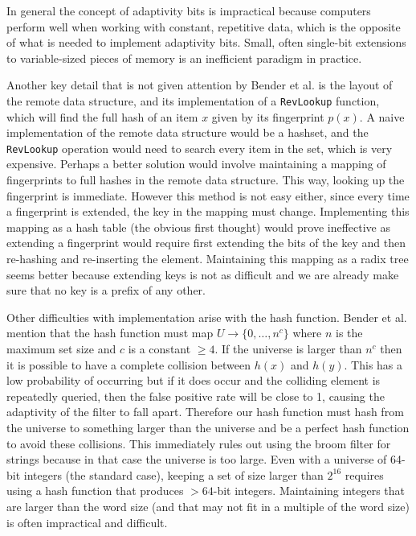 \documentclass[../paper.tex]{subfiles}
\begin{document}
In general the concept of adaptivity bits is impractical because computers perform
well when working with constant, repetitive data, which is the opposite
of what is needed to implement adaptivity bits. Small, often single-bit
extensions to variable-sized pieces of memory is an inefficient paradigm
in practice.

Another key detail that is not given attention by Bender et al. is the layout
of the remote data structure, and its implementation of a \texttt{RevLookup}
function, which will find the full hash of an item $x$ given by its fingerprint
$p(x)$. A naive implementation of the remote data structure would be a hashset,
and the \texttt{RevLookup} operation would need to search every item in the
set, which is very expensive. Perhaps a better solution would involve maintaining
a mapping of fingerprints to full hashes in the remote data structure. This
way, looking up the fingerprint is immediate. However this method is not easy
either, since every time a fingerprint is extended, the key in the mapping must change.
Implementing this mapping as a hash table (the obvious first thought) would prove
ineffective as extending a fingerprint would require first extending the bits of
the key and then re-hashing and re-inserting the element. Maintaining this mapping
as a radix tree seems better because extending keys is not as difficult and
we are already make sure that no key is a prefix of any other.

Other difficulties with implementation arise with the hash function. Bender et al.
mention that the hash function must map $U \rightarrow \{0,\ldots,n^c\}$ where
$n$ is the maximum set size and $c$ is a constant $\geq 4$. If the universe
is larger than $n^c$ then it is possible to have a complete collision between
$h(x)$ and $h(y)$. This has a low probability of occurring but if it does
occur and the colliding element is repeatedly queried, then the false positive
rate will be close to 1, causing the adaptivity of the filter to fall apart. Therefore
our hash function must hash from the universe to something larger than the universe
and be a perfect hash function to avoid these collisions. This immediately rules
out using the broom filter for strings because in that case the universe is too large.
Even with a universe of 64-bit integers (the standard case), keeping a set of size
larger than $2^{16}$ requires using a hash function that produces $>64$-bit integers.
Maintaining integers that are larger than the word size (and that may not fit in a multiple
of the word size) is often impractical and difficult.
\end{document}
